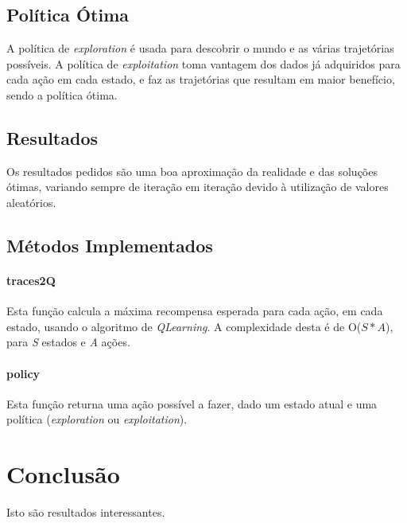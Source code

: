 \documentclass[12pt,a4paper]{article}
\begin{document}
\begin{multicols}{2}
	
	\subsection{Política Ótima}
	A política de \textit{exploration} é usada para descobrir o mundo e as várias
	trajetórias possíveis. A política de \textit{exploitation} toma vantagem
	dos dados já adquiridos para cada ação em cada estado, e faz as trajetórias
	que resultam em maior benefício, sendo a política ótima.

	\subsection{Resultados}
	Os resultados pedidos são uma boa aproximação da realidade e das
	soluções ótimas, variando sempre de iteração em iteração devido à
	utilização de valores aleatórios.
	
	\subsection{Métodos Implementados}
	\paragraph{traces2Q}
	Esta função calcula a máxima recompensa esperada para cada ação, em
	cada estado, usando o algoritmo de \textit{QLearning}.
	A complexidade desta é de O(${S * A}$), para \textit{S} estados e
	\textit{A} ações.

	\paragraph{policy}
	Esta função returna uma ação possível a fazer, dado um estado atual
	e uma política (\textit{exploration} ou \textit{exploitation}).


	\section{Conclusão}
	Isto são resultados interessantes.

\end{multicols}
\end{document}
